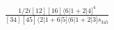 \documentclass[varwidth, border=5pt]{standalone}
\begin{document}
\begin{my}
$\begin{gathered}
\scriptscriptstyle\frac{1/2i[12][16]\langle6|1+2|4]^4}{[34][45]\langle2|1+6|5]\langle6|1+2|3]s_{345}}
\end{gathered}$
\end{my}
\end{document}
